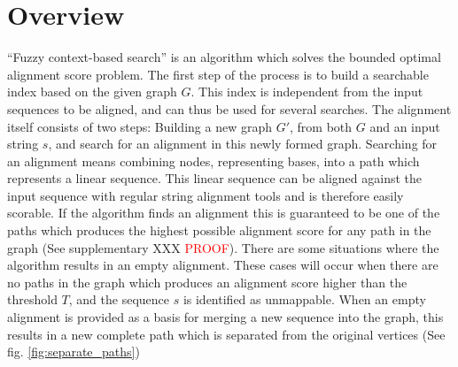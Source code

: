 \documentclass{article}
\begin{document}
\section{Overview}
``Fuzzy context-based search'' is an algorithm which solves the bounded optimal alignment score problem. The first step of the process is to build a searchable index based on the given graph $G$. This index is independent from the input sequences to be aligned, and can thus be used for several searches. The alignment itself consists of two steps: Building a new graph $G'$, from both $G$ and an input string $s$, and search for an alignment in this newly formed graph. Searching for an alignment means combining nodes, representing bases, into a path which represents a linear sequence. This linear sequence can be aligned against the input sequence with regular string alignment tools and is therefore easily scorable. If the algorithm finds an alignment this is guaranteed to be one of the paths which produces the highest possible alignment score for any path in the graph (See supplementary XXX \textcolor{red}{PROOF}). There are some situations where the algorithm results in an empty alignment. These cases will occur when there are no paths in the graph which produces an alignment score higher than the threshold $T$, and the sequence $s$ is identified as unmappable. When an empty alignment is provided as a basis for merging a new sequence into the graph, this results in a new complete path which is separated from the original vertices (See fig. \ref{fig:separate_paths})
\end{document}
